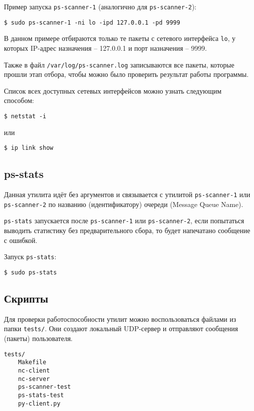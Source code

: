 \newpage

Пример запуска \verb|ps-scanner-1| (аналогично для \verb|ps-scanner-2|):
\begin{lstlisting}
$ sudo ps-scanner-1 -ni lo -ipd 127.0.0.1 -pd 9999
\end{lstlisting}
В данном примере отбираются только те пакеты с сетевого интерфейса \verb|lo|, у которых IP-адрес назначения -- 127.0.0.1 и порт назначения -- 9999.

\linespace

Также в файл \verb|/var/log/ps-scanner.log| записываются все пакеты, которые прошли этап отбора, чтобы можно было проверить результат работы программы.

\linespace

Список всех доступных сетевых интерфейсов можно узнать следующим способом:
\begin{lstlisting}
$ netstat -i
\end{lstlisting}
или
\begin{lstlisting}
$ ip link show
\end{lstlisting}

\subsection{ps-stats}

Данная утилита идёт без аргументов и связывается с утилитой \verb|ps-scanner-1| или \verb|ps-scanner-2| по названию (идентификатору) очереди (Message Queue Name).

\verb|ps-stats| запускается после \verb|ps-scanner-1| или \verb|ps-scanner-2|, если попытаться выводить статистику без предварительного сбора, то будет напечатано сообщение с ошибкой.

\linespace

Запуск \verb|ps-stats|:
\begin{lstlisting}
$ sudo ps-stats
\end{lstlisting}

\newpage

\subsection{Скрипты}

Для проверки работоспособности утилит можно воспользоваться файлами из папки \verb|tests/|. Они создают локальный UDP-сервер и отправляют сообщения (пакеты) пользователя.

\begin{lstlisting}
tests/
    Makefile
    nc-client
    nc-server
    ps-scanner-test
    ps-stats-test
    py-client.py
\end{lstlisting}

